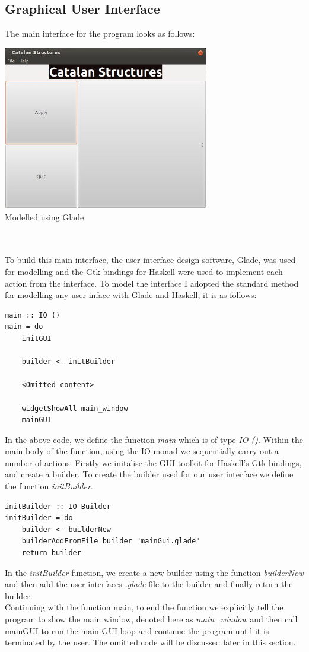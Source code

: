 \documentclass[12pt]{article}
\begin{document}
\subsection{Graphical User Interface}
The main interface for the program looks as follows:\\

{\centering
\includegraphics[width=90mm]{mainGUIScreenshot.jpeg}\\
\caption{Modelled using Glade \cite{Glade}}}\\
\\
To build this main interface, the user interface design software, Glade, was used for modelling and the Gtk bindings for Haskell were used to implement each action from the interface. To model the interface I adopted the standard method for modelling any user inface with Glade and Haskell, it is as follows:
\begin{lstlisting}
main :: IO ()
main = do
	initGUI 
	
	builder <- initBuilder

	<Omitted content>

	widgetShowAll main_window
	mainGUI 
\end{lstlisting}
In the above code, we define the function {\it main} which is of type {\it IO ()}. Within the main body of the function, using the IO monad we sequentially carry out a number of actions. Firstly we initalise the GUI toolkit for Haskell's Gtk bindings, and create a builder. To create the builder used for our user interface we define the function {\it initBuilder}.
\begin{lstlisting}
initBuilder :: IO Builder
initBuilder = do
	builder <- builderNew 
	builderAddFromFile builder "mainGui.glade" 
	return builder
\end{lstlisting}
In the {\it initBuilder} function, we create a new builder using the function {\it builderNew} and then add the user interfaces {\it .glade} file to the builder and finally return the builder.\\
Continuing with the function main, to end the function we explicitly tell the program to show the main window, denoted here as {\it main\_window} and then call mainGUI to run the main GUI loop and continue the program until it is terminated by the user. The omitted code will be discussed later in this section.
\end{document}
